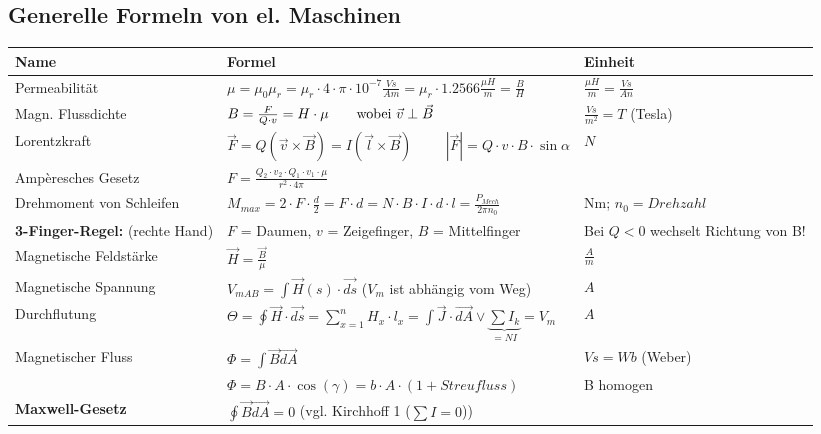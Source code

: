 \subsection{Generelle Formeln von el. Maschinen}
\renewcommand{\arraystretch}{2}
	\begin{tabular}[c]{ | p{5cm} | p{8cm} | p{4cm} | }
		\hline
		\textbf{Name} & \textbf{Formel} & \textbf{Einheit}\\    
		\hline
		Permeabilität
		& $\mu = \mu_0 \mu_r = \mu_r \cdot 4 \cdot \pi \cdot 10^{-7}
		\frac{Vs}{Am} = \mu_r \cdot 1.2566 \frac{\mu H}{m}=\frac{B}{H}$ &$\frac{\mu
		H}{m}=\frac{Vs}{An}$\\
		\hline 
		Magn. Flussdichte %
		& $B = \frac{F}{Q \cdot v} = H \cdot \mu \text{\qquad wobei } \vec{v} \perp
		\vec{B}$ & $\frac{Vs}{m^2} = T$ (Tesla) \\
		\hline
		Lorentzkraft
		& $\vec{F} = Q (\vec{v} \times \vec{B})=I(\vec{l}\times \vec{B}) \hspace{1cm} |\vec{F}| = Q \cdot v \cdot B
		\cdot \sin\alpha$
		&$N$\\
		Ampèresches Gesetz
		&$F=\frac{Q_2 \cdot v_2 \cdot Q_1 \cdot v_1 \cdot \mu}{r^2 \cdot 4\pi}$
		&\\
		\hline
		Drehmoment von Schleifen
		& $M_{max} = 2 \cdot F \cdot \frac{d}{2}= F \cdot d = N \cdot B \cdot
		I \cdot d \cdot l = \frac{P_{Mech}}{2 \pi n_0} $
		& Nm; $n_0= Drehzahl$\\
		\hline
		\textbf{3-Finger-Regel:}
		(rechte Hand)
		& $F$ = Daumen, $v$ = Zeigefinger, $B$ = Mittelfinger
		& Bei $Q < 0$ wechselt Richtung von B!\\
		\hline
		Magnetische Feldstärke
		& $\vec{H} = \frac{ \vec{B}}{\mu }$
		& $\frac{A}{m}$\\
		Magnetische Spannung
		& $V_{mAB} = \int\limits \vec{H}(s) \cdot \vec{ds}$ ($V_m$ ist abhängig vom
		Weg) & $A$ \\
		\hline
		Durchflutung
		& $\Theta = \oint\vec{H} \cdot \vec{ds} = \sum\limits_{x=1}^n H_x \cdot l_x = \int\limits \vec{J}
		\cdot \vec{dA} \vee \underbrace{\sum I_k}_{= N I} = V_m$
		& $A$\\
		\hline
		Magnetischer Fluss
		& $\Phi = \int \vec{B} \vec{dA}$
		& $Vs = Wb$ (Weber)\\
		& $\Phi = B \cdot A \cdot \cos(\gamma)=b \cdot A \cdot (1+Streufluss)$
		& B homogen\\
		\hline
		\textbf{Maxwell-Gesetz}
		& $\oint \vec{B} \vec{dA} = 0$ (vgl. Kirchhoff 1 ($\sum I = 0$))
		&\\

\end{tabular}
